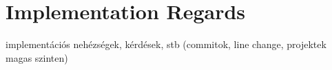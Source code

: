 \section{Implementation Regards}\label{sec:implementation-regards}

implementációs nehézségek, kérdések, stb (commitok, line change, projektek magas szinten)